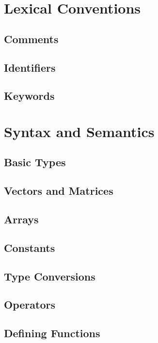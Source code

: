 \documentclass[11pt]{article}
\begin{document}
\section{Lexical Conventions}

\subsection{Comments}

\subsection{Identifiers}

\subsection{Keywords}

\section{Syntax and Semantics}

\subsection{Basic Types}

\subsection{Vectors and Matrices}

\subsection{Arrays}

\subsection{Constants}

\subsection{Type Conversions}

\subsection{Operators}

\subsection{Defining Functions}
\end{document}
